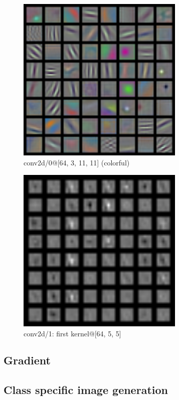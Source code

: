 \begin{figure}[H]
    \centering
    \includegraphics[width=8cm]{images/alexnet_0_kernels.png}
    \caption{conv2d/0@[64, 3, 11, 11] (colorful)}
    \label{fig:alexnet_0_kernels}
\end{figure}

\begin{figure}[H]
    \centering
    \includegraphics[width=8cm]{images/alexnet_1_1_kernels.png}
    \caption{conv2d/1: first kernel@[64, 5, 5]}
    \label{fig:alexnet_0_kernels}
\end{figure}

\subsection{Gradient}
\subsection{Class specific image generation}